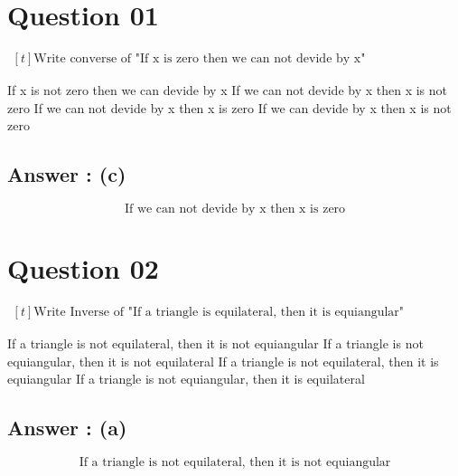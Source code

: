 \documentclass[17pt]{extarticle}
\begin{document}
\noindent
\begin{fleqn} 


\section{Question 01} 
$\begin{aligned}[t] 
\text {Write converse of "If x is zero then we can not devide by x" } 
\end{aligned}$

\begin{tasks}
  \task If x is not zero then we can devide by x 
  \task If we can not devide by x then x is not zero 
  \task If we can not devide by x then x is zero
  \task If we can devide by x then x is not zero
\end{tasks}
\subsection*{Answer : (c)}
\begin{equation} \nonumber
\text {If we can not devide by x then x is zero}
\end{equation}

\section{Question 02} 

$\begin{aligned}[t] 
\text {Write Inverse of "If a triangle is equilateral, then it is equiangular" } 
\end{aligned}$

\begin{tasks}
  \task If a triangle is not equilateral, then it is not equiangular 
  \task If a triangle is not equiangular, then it is not equilateral 
  \task If a triangle is not equilateral, then it is equiangular
  \task If a triangle is not equiangular, then it is equilateral
\end{tasks}
\subsection*{Answer : (a)}
\begin{equation} \nonumber
\text {If a triangle is not equilateral, then it is not equiangular}
\end{equation}


\end{fleqn}
\end{document}
